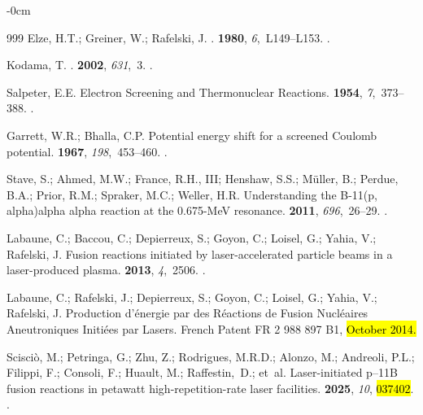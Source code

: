 \documentclass[particles,article,accept,pdftex,moreauthors]{Definitions/mdpi}
\begin{document}
\begin{adjustwidth}{-\extralength}{0cm}
\begin{thebibliography}{999}
Elze, H.T.; Greiner, W.;  Rafelski, J.
.
 {\bf 1980}, {\em 6},~L149--L153.
.

Kodama, T.
.
 {\bf 2002}, {\em 631},~3.
.

Salpeter, E.E.
\newblock Electron Screening and Thermonuclear Reactions.
 {\bf 1954}, {\em 7},~373--388.
.

Garrett, W.R.; Bhalla, C.P.
\newblock Potential energy shift for a screened Coulomb potential.
 {\bf 1967}, {\em 198},~453--460.
.

Stave, S.; Ahmed, M.W.;  France, R.H., III; Henshaw, S.S.; Müller, B.; Perdue, B.A.; Prior, R.M.; Spraker, M.C.; Weller, H.R.
\newblock Understanding the B-11(p, alpha)alpha alpha reaction at the 0.675-MeV
  resonance.
 {\bf 2011}, {\em 696},~26--29.
.

Labaune, C.; Baccou, C.; Depierreux, S.; Goyon, C.; Loisel, G.; Yahia, V.; Rafelski, J.
\newblock Fusion reactions initiated by laser-accelerated particle beams in a
  laser-produced plasma.
 {\bf 2013}, {\em 4},~2506.
.

Labaune, C.; Rafelski, J.;  Depierreux, S.; Goyon, C.; Loisel, G.; Yahia, V.; Rafelski, J.
\newblock Production d'{\'e}nergie par des R{\'e}actions de Fusion
  Nucl{\'e}aires Aneutroniques Initi{\'e}es par Lasers.
\newblock French Patent FR 2 988 897 B1,  \hl{October 2014.} %


Scisci{\`o}, M.; Petringa, G.;  Zhu, Z.; Rodrigues, M.R.D.; Alonzo, M.; Andreoli, P.L.; Filippi, F.; Consoli, F.; Huault, M.; Raffestin,~D.; et~al.
\newblock Laser-initiated p--11B fusion reactions in petawatt
  high-repetition-rate laser facilities.
 {\bf 2025}, {\em 10}, \hl{037402}.
.


\end{thebibliography}
\end{adjustwidth}
\end{document}
